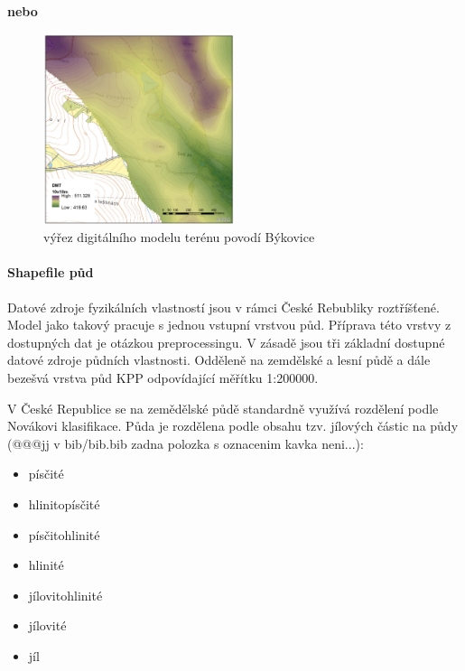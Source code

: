 \textbf{nebo}

\begin{figure}
  \centering
  \includegraphics[width=0.5\textwidth]{./img/DMT_byk.png}
  \caption{výřez digitálního modelu terénu povodí Býkovice}
  \label{fig:bykovicedmt}
\end{figure}

 
\paragraph{Shapefile půd} \label{sec:vstuppuda}

Datové zdroje fyzikálních vlastností jsou v rámci České Rebubliky roztříšťené. Model jako takový pracuje s jednou vstupní vrstvou půd. Příprava této vrstvy z dostupných dat je otázkou preprocessingu. V zásadě jsou tři základní dostupné datové zdroje půdních vlastnosti. Odděleně na zemdělské a lesní půdě a dále bezešvá vrstva půd KPP odpovídající měřítku 1:200000.

V České Republice se na zemědělské půdě standardně využívá rozdělení podle Novákovi klasifikace. Půda je rozdělena podle obsahu tzv. jílových částic na půdy \cite{kavka} (@@@jj v bib/bib.bib zadna polozka s oznacenim kavka neni...):
\begin{itemize} \itemsep 0pt
  \item písčité
  \item hlinitopísčité
  \item písčitohlinité
  \item hlinité
  \item jílovitohlinité
  \item jílovité
  \item jíl
\end{itemize}

